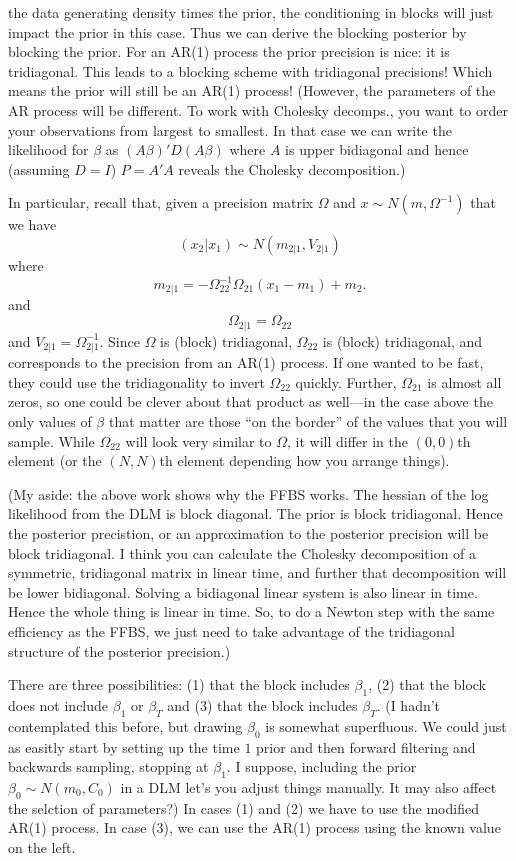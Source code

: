 \documentclass{article}
\begin{document}
the data generating density times the prior, the conditioning in blocks will
just impact the prior in this case.  Thus we can derive the blocking posterior
by blocking the prior.  For an AR(1) process the prior precision is nice: it is
tridiagonal.  This leads to a blocking scheme with tridiagonal precisions!
Which means the prior will still be an AR(1) process!  (However, the parameters
of the AR process will be different.  To work with Cholesky decomps., you want
to order your observations from largest to smallest.  In that case we can write
the likelihood for $\beta$ as $(A \beta)' D (A \beta)$ where $A$ is upper
bidiagonal and hence (assuming $D=I$) $P = A'A$ reveals the Cholesky
decomposition.)

In particular, recall that, given a precision matrix $\Omega$ and $x \sim N(m,
\Omega^{-1})$ that we have
\[
(x_2 | x_1) \sim N(m_{2|1}, V_{2|1})
\]
where
\[
m_{2|1} = -\Omega_{22}^{-1} \Omega_{21} (x_1 - m_1) + m_2.
\]
and
\[
\Omega_{2|1} = \Omega_{22}
\]
and $V_{2|1} = \Omega_{2|1}^{-1}$.  Since $\Omega$ is (block) tridiagonal,
$\Omega_{22}$ is (block) tridiagonal, and corresponds to the precision from an
AR(1) process.  If one wanted to be fast, they could use the tridiagonality to
invert $\Omega_{22}$ quickly.  Further, $\Omega_{21}$ is almost all zeros, so
one could be clever about that product as well---in the case above the only
values of $\beta$ that matter are those ``on the border'' of the values that you
will sample.  While $\Omega_{22}$ will look very similar to $\Omega$, it will
differ in the $(0,0)$th element (or the $(N,N)$th element depending how you
arrange things).

(My aside: the above work shows why the FFBS works.  The hessian of the log
likelihood from the DLM is block diagonal.  The prior is block tridiagonal.
Hence the posterior precistion, or an approximation to the posterior precision
will be block tridiagonal.  I think you can calculate the Cholesky decomposition
of a symmetric, tridiagonal matrix in linear time, and further that
decomposition will be lower bidiagonal.  Solving a bidiagonal linear system is
also linear in time.  Hence the whole thing is linear in time.  So, to do a
Newton step with the same efficiency as the FFBS, we just need to take advantage
of the tridiagonal structure of the posterior precision.)

There are three possibilities: (1) that the block includes $\beta_1$, (2) that
the block does not include $\beta_1$ or $\beta_T$ and (3) that the block
includes $\beta_T$.  (I hadn't contemplated this before, but drawing $\beta_0$
is somewhat superfluous.  We could just as easitly start by setting up the time
$1$ prior and then forward filtering and backwards sampling, stopping at
$\beta_1$.  I suppose, including the prior $\beta_0 \sim N(m_0, C_0)$ in a DLM
let's you adjust things manually.  It may also affect the selction of
parameters?)  In cases (1) and (2) we have to use the modified AR(1) process.
In case (3), we can use the AR(1) process using the known value on the left.
\end{document}
